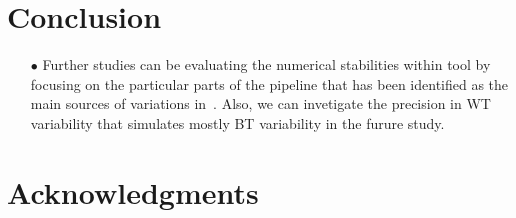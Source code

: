 \documentclass[conference]{IEEEtran}
\begin{document}

\section{Conclusion}

\begin{itemize}

    \item[$\bullet$ ] Further studies can be evaluating the numerical stabilities within tool by focusing on the particular parts of
    the pipeline that has been identified as the main sources of variations in~\cite{bowring2021isolating}.
    Also, we can invetigate the precision in WT variability that simulates mostly BT variability in the furure study.

\end{itemize}


\section{Acknowledgments}




\end{document}
